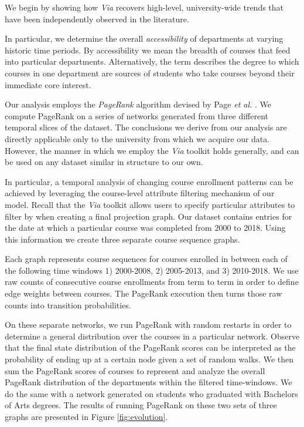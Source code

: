 \documentclass{sigchi}
\begin{document}
We begin by showing how {\em Via} recovers high-level, university-wide
trends that have been independently observed in the literature. 

In particular, we determine the overall {\em accessibility} of
departments at varying historic time periods. By accessibility we mean
the breadth of courses that feed into particular
departments. Alternatively, the term describes the degree to which
courses in one department are sources of students who take courses
beyond their immediate core interest.

Our analysis employs the {\em PageRank} algorithm devised by Page
\textit{et al.}  \cite{Page1999}. We compute PageRank on a series of
networks generated from three different temporal slices of the
dataset. The conclusions we derive from our analysis are directly
applicable only to the university from which we acquire our
data. However, the manner in which we employ the \textit{Via} toolkit
holds generally, and can be used on any dataset similar in structure
to our own.

In particular, a temporal analysis of changing course enrollment
patterns can be achieved by leveraging the course-level attribute
filtering mechanism of our model. Recall that the \textit{Via} toolkit
allows users to specify particular attributes to filter by when
creating a final projection graph. Our dataset contains entries for
the date at which a particular course was completed from 2000 to
2018. Using this information we create three separate course sequence
graphs.

Each graph represents course sequences for courses enrolled in between
each of the following time windows 1) 2000-2008, 2) 2005-2013, and 3)
2010-2018. We use raw counts of consecutive course enrollments from
term to term in order to define edge weights between courses. The
PageRank execution then turns those raw counts into transition
probabilities.

On these separate networks, we run PageRank with random restarts in
order to determine a general distribution over the courses in a
particular network. Observe that the final state distribution of the
PageRank scores can be interpreted as the probability of ending up at
a certain node given a set of random walks. We then sum the PageRank
scores of courses to represent and analyze the overall PageRank
distribution of the departments within the filtered time-windows. We
do the same with a network generated on students who graduated with
Bachelors of Arts degrees. The results of running PageRank on these
two sets of three graphs are presented in Figure \ref{fig:evolution}.
\end{document}
